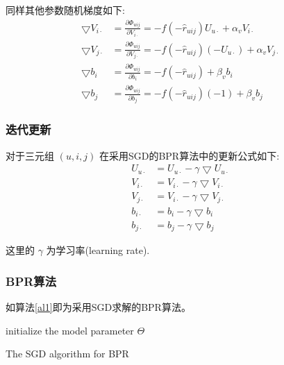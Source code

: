 同样其他参数随机梯度如下:
\begin{align} %
\bigtriangledown V_{i\cdot} &= \frac{\partial \Phi_{uij}}{\partial V_{i\cdot}}=-f\left(-\hat{r}_{uij}\right)U_{u\cdot} + \alpha_vV_{i\cdot}\\
\bigtriangledown V_{j\cdot} &= \frac{\partial \Phi_{uij}}{\partial V_{j\cdot}}=-f\left(-\hat{r}_{uij}\right)\left(-U_{u\cdot}\right) + \alpha_vV_{j\cdot}\\
\bigtriangledown b_i        &= \frac{\partial \Phi_{uij}}{\partial b_i} =-f\left(-\hat{r}_{uij}\right)+\beta_vb_i\\
\bigtriangledown b_j        &= \frac{\partial \Phi_{uij}}{\partial b_j} =-f\left(-\hat{r}_{uij}\right)\left(-1\right)+\beta_vb_j
\end{align}

\subsubsection{迭代更新}
对于三元组  $\left(u,i,j\right)$ 在采用SGD的BPR算法中的更新公式如下:
\begin{align}
	\label{eq10}
U_{u\cdot} &= U_{u\cdot} - \gamma\bigtriangledown U_{u\cdot}\\
V_{i\cdot} &= V_{i\cdot} - \gamma\bigtriangledown V_{i\cdot}\\
V_{j\cdot} &= V_{i\cdot} - \gamma\bigtriangledown V_{j\cdot}\\
b_{i\cdot} &= b_i - \gamma\bigtriangledown b_{i}\\
b_{j\cdot} &= b_j - \gamma\bigtriangledown b_{j}
\end{align}

这里的 $\gamma$ 为学习率(learning rate).

\subsubsection{BPR算法}
如算法\ref{al1}即为采用SGD求解的BPR算法。
\IncMargin{1em}
\begin{algorithm}[ht]
	\SetAlgoNoLine %
	\BlankLine
	
	initialize the model parameter $\Theta$\;
	\caption{The SGD algorithm for BPR}
	\label{al1}%
\end{algorithm}
\DecMargin{1em}

